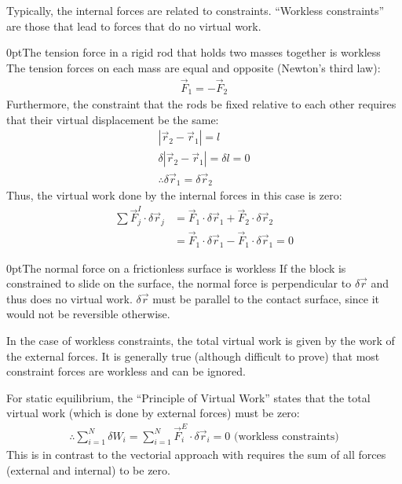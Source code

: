 Typically, the internal forces are related to constraints. ``Workless constraints'' are those that lead to forces that do no virtual work.
\begin{example}{0pt}{The tension force in a rigid rod that holds two masses together is workless}{}
The tension forces on each mass are equal and opposite (Newton's third law):
\begin{align*}
\vec{F}_1=-\vec{F}_2
\end{align*}
Furthermore, the constraint that the rods be fixed relative to each other requires that their virtual displacement be the same:
\begin{align*}
\left|\vec{r}_2-\vec{r}_1\right|=l\nonumber\\
\delta \left|\vec{r}_2-\vec{r}_1\right|=\delta l=0\nonumber\\
\therefore \delta\vec{r}_1=\delta \vec{r}_2
\end{align*}
Thus, the virtual work done by the internal forces in this case is zero:
\begin{align*}
\sum\vec{F}^I_j\cdot\delta\vec{r}_j&=\vec{F}_1\cdot\delta\vec{r}_1+\vec{F}_2\cdot\delta\vec{r}_2\nonumber\\
&=\vec{F}_1\cdot\delta\vec{r}_1-\vec{F}_1\cdot\delta\vec{r}_1=0
\end{align*}
\end{example}
\begin{example}{0pt}{The normal force on a frictionless surface is workless}{}
If the block is constrained to slide on the surface, the normal force is perpendicular to $\delta \vec{r}$ and thus does no virtual work. $\delta \vec{r}$ must be parallel to the contact surface, since it would not be reversible otherwise.
\end{example}

In the case of workless constraints, the total virtual work is given by the work of the external forces. It is generally true (although difficult to prove) that most constraint forces are workless and can be ignored.

For static equilibrium, the ``Principle of Virtual Work'' states that the total virtual work (which is done by external forces) must be zero:
\begin{align}
\therefore \sum_{i=1}^N\delta W_i=\sum_{i=1}^N \vec{F}^E_i\cdot\delta\vec{r}_i = 0 \text{   (workless constraints)}
\end{align}
This is in contrast to the vectorial approach with requires the sum of all forces (external and internal) to be zero.


